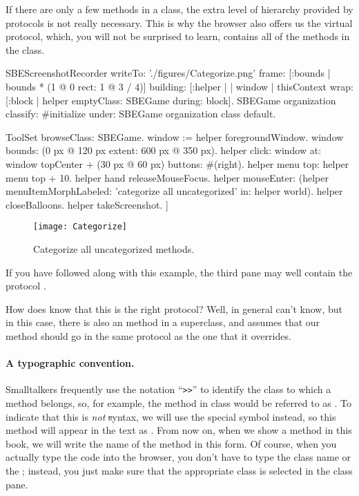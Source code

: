 \documentclass[a4paper,10pt,twoside]{book}
\begin{document}
If there are only a few methods in a class, the extra level of hierarchy provided by protocols is not really necessary.
This is why the browser also offers us the  virtual protocol, which, you will not be surprised to learn, contains all of the methods in the class.

\begin{ExecuteSmalltalkScript}
SBEScreenshotRecorder writeTo: './figures/Categorize.png' frame: [:bounds | bounds * (1 @ 0 rect: 1 @ 3 / 4)] building: [:helper |
	| window |
	thisContext wrap: [:block |
		helper emptyClass: SBEGame during: block].
	SBEGame organization classify: #initialize under: SBEGame organization class default.

	ToolSet browseClass: SBEGame.
	window := helper foregroundWindow.
	window bounds: (0 px @ 120 px extent: 600 px @ 350 px).
	helper click: window at: window topCenter + (30 px @ 60 px) buttons: #(right).
	helper menu top: helper menu top + 10.
	helper hand releaseMouseFocus.
	helper mouseEnter: (helper menuItemMorphLabeled: 'categorize all uncategorized' in: helper world).
	helper closeBalloons.
	helper takeScreenshot.
]
\end{ExecuteSmalltalkScript}
\begin{figure}[htbp]
	\centering
	\texttt{[image: Categorize]}
	\caption{Categorize all uncategorized methods.\label{fig:categorize}}
\end{figure}

If you have followed along with this example, the third pane may well contain the protocol .

How does \squeak{} know that this is the right protocol?
Well, in general \squeak{} can't know, but in this case, there is also an  method in a superclass, and \squeak assumes that our  method should go in the same protocol as the one that it overrides.

\paragraph{A typographic convention.}
Smalltalkers frequently use the notation ``\verb|>>|'' to identify the class to which a method belongs, so, for example, the  method in class  would be referred to as .
To indicate that this is \emph{not} \st syntax, we will use the special symbol \ct{>>>} instead, so this method will appear in the text as .
From now on, when we show a method in this book, we will write the name of the method in this form.
Of course, when you actually type the code into the browser, you don't have to type the class name or the \ct{>>>}; instead, you just make sure that the appropriate class is selected in the class pane.
\end{document}
